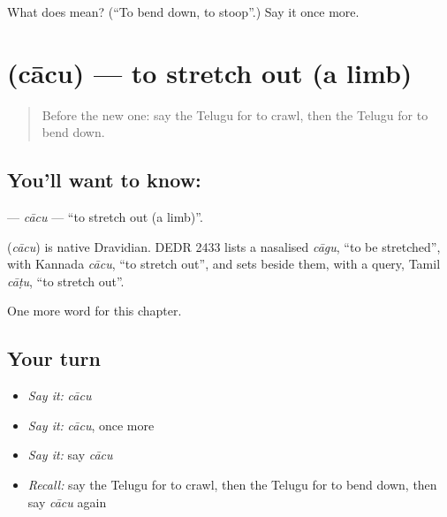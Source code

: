 \begin{tcolorbox}[breakable,colback=teal!4,colframe=teal!35!black,title={Before you move on}]
What does  mean? (\textquotedblleft{}To bend down, to stoop\textquotedblright{}.) Say it once more.
\end{tcolorbox}
\section[\texorpdfstring{\te{చాచు} (cācu)}{చాచు (cācu)}]{ (cācu) — to stretch out (a limb)}

\label{lesson:TE-C249-cacu}



\begin{quote}
Before the new one: say the Telugu for to crawl, then the Telugu for to bend down.
\end{quote}

\subsection*{You'll want to know: }
\textbf{} — \emph{cācu} — \textquotedblleft{}to stretch out (a limb)\textquotedblright{}.

\begin{cousinweb}
\textbf{} (\emph{cācu}) is native Dravidian. DEDR 2433 lists a nasalised \emph{cāgu}, \textquotedblleft{}to be stretched\textquotedblright{}, with Kannada \emph{cācu}, \textquotedblleft{}to stretch out\textquotedblright{}, and sets beside them, with a query, Tamil \emph{cāṭu}, \textquotedblleft{}to stretch out\textquotedblright{}.
\end{cousinweb}

\begin{grammarlens}[title={What you've built}]
One more word for this chapter.
\end{grammarlens}

\subsection*{Your turn}
\begin{itemize}
\raggedright
  \item \emph{Say it:} \emph{cācu}
  \item \emph{Say it:} \emph{cācu}, once more
  \item \emph{Say it:} say \emph{cācu}
  \item \emph{Recall:} say the Telugu for to crawl, then the Telugu for to bend down, then say \emph{cācu} again
\end{itemize}


